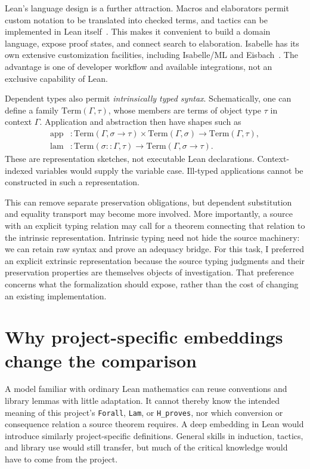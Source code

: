 \documentclass[12pt,leqno]{article}
\newcommand{\IC}{\ensuremath{\rightarrow}}
\newcommand{\isa}[1]{\nolinkurl{#1}}
\begin{document}
Lean's language design is a further attraction. Macros and elaborators permit
custom notation to be translated into checked terms, and tactics can be
implemented in Lean itself~\cite{lean-meta}. This makes it convenient to build
a domain language, expose proof states, and connect search to elaboration.
Isabelle has its own extensive customization facilities, including
Isabelle/ML and Eisbach~\cite{isabelle,isar}. The advantage is one of developer
workflow and available integrations, not an exclusive capability of Lean.

Dependent types also permit \emph{intrinsically typed syntax}. Schematically,
one can define a family $\mathrm{Term}(\Gamma,\tau)$, whose members are terms
of object type $\tau$ in context $\Gamma$. Application and abstraction then
have shapes such as
\[
\begin{aligned}
\mathrm{app}&:
 \mathrm{Term}(\Gamma,\sigma\IC\tau)\times
 \mathrm{Term}(\Gamma,\sigma)\longrightarrow\mathrm{Term}(\Gamma,\tau),\\
\mathrm{lam}&:
 \mathrm{Term}(\sigma::\Gamma,\tau)
 \longrightarrow\mathrm{Term}(\Gamma,\sigma\IC\tau).
\end{aligned}
\]
These are representation sketches, not executable Lean declarations.
Context-indexed variables would supply the variable case. Ill-typed
applications cannot be constructed in such a representation.

This can remove separate preservation obligations, but dependent substitution
and equality transport may become more involved. More importantly, a source
with an explicit typing relation may call for a theorem connecting that
relation to the intrinsic representation. Intrinsic typing need not hide the
source machinery: we can retain raw syntax and prove an adequacy bridge.
For this task, I preferred an explicit extrinsic representation because the
source typing judgments and their preservation properties are themselves
objects of investigation. That preference concerns what the formalization
should expose, rather than the cost of changing an existing implementation.

\section{Why project-specific embeddings change the comparison}

A model familiar with ordinary Lean mathematics can reuse conventions and
library lemmas with little adaptation. It cannot thereby know the intended
meaning of this project's \isa{Forall}, \isa{Lam}, or \isa{H_proves}, nor which
conversion or consequence relation a source theorem requires. A deep embedding in Lean
would introduce similarly project-specific definitions. General skills in
induction, tactics, and library use would still transfer, but much of the
critical knowledge would have to come from the project.
\end{document}
